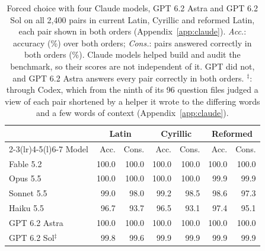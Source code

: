 \begin{table}[t]
\centering\small
\setlength{\tabcolsep}{4pt}
\begin{tabular}{@{}lrrrrrr@{}}
\toprule
 & \multicolumn{2}{c}{Latin} & \multicolumn{2}{c}{Cyrillic} & \multicolumn{2}{c}{Reformed} \\
\cmidrule(lr){2-3}\cmidrule(lr){4-5}\cmidrule(l){6-7}
Model & Acc. & Cons. & Acc. & Cons. & Acc. & Cons. \\
\midrule
Fable 5.2 & 100.0 & 100.0 & 100.0 & 100.0 & 100.0 & 100.0 \\
Opus 5.5 & 100.0 & 100.0 & 100.0 & 100.0 & 99.9 & 99.9 \\
Sonnet 5.5 & 99.0 & 98.0 & 99.2 & 98.5 & 98.6 & 97.3 \\
Haiku 5.5 & 96.7 & 93.7 & 96.5 & 93.1 & 97.4 & 95.1 \\
\midrule
GPT 6.2 Astra & 100.0 & 100.0 & 100.0 & 100.0 & 100.0 & 100.0 \\
GPT 6.2 Sol$^\ddagger$ & 99.8 & 99.6 & 99.9 & 99.9 & 99.9 & 99.9 \\
\bottomrule
\end{tabular}
\caption{Forced choice with four Claude models, GPT 6.2 Astra and GPT 6.2 Sol on all 2{,}400 pairs in current Latin, Cyrillic and reformed Latin, each pair shown in both orders (Appendix~\ref{app:claude}). \emph{Acc.}: accuracy (\%) over both orders; \emph{Cons.}: pairs answered correctly in both orders (\%). Claude models helped build and audit the benchmark, so their scores are not independent of it. GPT did not, and GPT 6.2 Astra answers every pair correctly in both orders. $^\ddagger$: through Codex, which from the ninth of its 96 question files judged a view of each pair shortened by a helper it wrote to the differing words and a few words of context (Appendix~\ref{app:claude}).}
\label{tab:claude}
\end{table}
